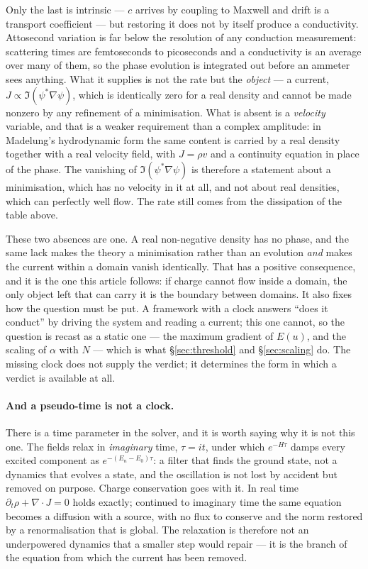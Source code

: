 \documentclass[11pt]{article}
\newcommand{\grad}{\nabla}
\begin{document}
\noindent Only the last is intrinsic --- $c$ arrives by coupling to Maxwell and drift is a transport
coefficient --- but restoring it does not by itself produce a conductivity. Attosecond variation is
far below the resolution of any conduction measurement: scattering times are femtoseconds to
picoseconds and a conductivity is an average over many of them, so the phase evolution is integrated
out before an ammeter sees anything. What it supplies is not the rate but the \emph{object} --- a
current, $J\propto\Im(\psi^*\grad\psi)$, which is identically zero for a real density and cannot be
made nonzero by any refinement of a minimisation. What is absent is a \emph{velocity} variable, and
that is a weaker requirement than a complex amplitude: in Madelung's hydrodynamic form
\cite{madelung} the same content is carried by a real density together with a real velocity field,
with $J=\rho v$ and a continuity equation in place of the phase. The vanishing of
$\Im(\psi^*\grad\psi)$ is therefore a statement about a minimisation, which has no velocity in it at
all, and not about real densities, which can perfectly well flow. The rate still comes from the
dissipation of the table above.

These two absences are one. A real non-negative density has no phase, and the same lack makes the
theory a minimisation rather than an evolution \emph{and} makes the current within a domain vanish
identically. That has a positive consequence, and it is the one this article follows: if charge
cannot flow inside a domain, the only object left that can carry it is the boundary between domains.
It also fixes how the question must be put. A framework with a clock answers ``does it conduct'' by
driving the system and reading a current; this one cannot, so the question is recast as a static one
--- the maximum gradient of $E(u)$, and the scaling of $\alpha$ with $N$ --- which is what
\S\ref{sec:threshold} and \S\ref{sec:scaling} do. The missing clock does not supply the verdict; it
determines the form in which a verdict is available at all.

\paragraph{And a pseudo-time is not a clock.} There is a time parameter in the solver, and it is
worth saying why it is not this one. The fields relax in \emph{imaginary} time, $\tau=it$, under
which $e^{-H\tau}$ damps every excited component as $e^{-(E_n-E_0)\tau}$: a filter that finds the
ground state, not a dynamics that evolves a state, and the oscillation is not lost by accident but
removed on purpose. Charge conservation goes with it. In real time $\partial_t\rho+\grad\cdot J=0$
holds exactly; continued to imaginary time the same equation becomes a diffusion with a source, with
no flux to conserve and the norm restored by a renormalisation that is global. The relaxation is
therefore not an underpowered dynamics that a smaller step would repair --- it is the branch of the
equation from which the current has been removed.
\end{document}
